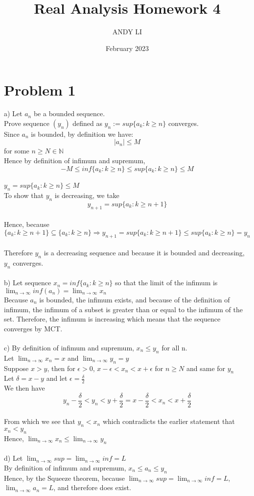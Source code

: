 \documentclass{article}
\title{Real Analysis Homework 4}
\author{ANDY LI}
\date{February 2023}
\begin{document}
\maketitle

\section*{Problem 1}
a) Let $a_n$ be a bounded sequence.
\\Prove sequence $(y_n)$ defined as $y_n := sup\{a_k: k \geq n\}$ converges.
\\Since $a_n$ is bounded, by definition we have: $$|a_n| \leq M$$ for some $n \geq N \in \mathbb{N}$
\\Hence by definition of infimum and supremum, $$-M \leq inf\{a_k : k \geq n\} \leq sup\{a_k : k \geq n\} \leq M$$
\\$y_n = sup\{a_k : k \geq n\} \leq M$
\\To show that $y_n$ is decreasing, we take $$y_{n+1} = sup\{a_k : k \geq n+1\}$$
\\Hence, because $$\{a_k : k \geq n+1\} \subseteq \{a_k : k \geq n\} \Rightarrow y_{n+1} = sup\{ a_k : k \geq n+1\} \leq sup\{a_k : k \geq n\} = y_n$$
\\Therefore $y_n$ is a decreasing sequence and because it is bounded and decreasing, $y_n$ converges.
\\
\\b) Let sequence $x_n = inf\{a_k : k \geq n\}$ so that the limit of the infimum is $\lim_{n \to \infty} inf(a_n) = \lim_{n \to \infty} x_n$
\\Because $a_n$ is bounded, the infimum exists, and because of the definition of infimum, the infimum of a subset is greater than or equal to the infimum of the set. Therefore, the infimum is increasing which means that the sequence converges by MCT.
\\
\\c) By definition of infimum and supremum, $x_n \leq y_n$ for all n.
\\Let $\lim_{n \to \infty} x_n = x$ and $\lim_{n \to \infty} y_n = y$
\\Suppose $x > y$, then for $\epsilon > 0$, $x - \epsilon < x_n < x + \epsilon$ for $n \geq N$ and same for $y_n$
\\Let $\delta = x - y$ and let $\epsilon = \frac{\delta}{2}$
\\We then have $$y_n - \frac{\delta}{2} < y_n < y + \frac{\delta}{2} = x - \frac{\delta}{2} < x_n < x + \frac{\delta}{2}$$
\\From which we see that $y_n < x_n$ which contradicts the earlier statement that $x_n < y_n$
\\Hence, $\lim_{n \to \infty} x_n \leq \lim_{n \to \infty} y_n$
\\
\\d) Let $\lim_{n \to \infty} sup = \lim_{n \to \infty} inf = L$
\\By definition of infimum and supremum, $x_n \leq a_n \leq y_n$
\\Hence, by the Squeeze theorem, because $\lim_{n \to \infty} sup = \lim_{n \to \infty} inf = L$, $ \lim_{n \to \infty} a_n = L$, and therefore does exist.
\end{document}
